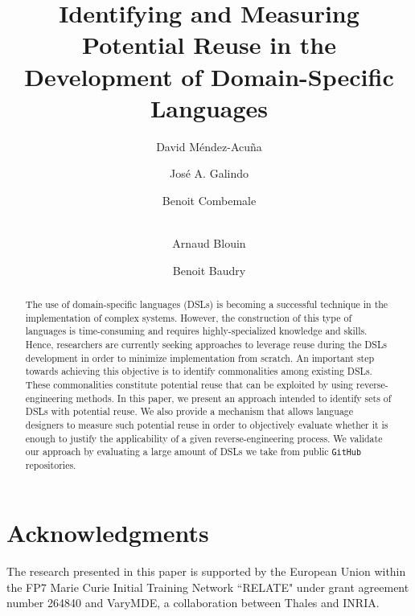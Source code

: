 \documentclass[runningheads,a4paper]{llncs}
\begin{document}
\mainmatter  %

\title{Identifying and Measuring Potential Reuse in the Development of Domain-Specific Languages}


\author{David M\'endez-Acu\~na \and Jos\'e A. Galindo \and Benoit Combemale \and \\ Arnaud Blouin \and Benoit Baudry}

\maketitle

\begin{abstract} 

The use of domain-specific languages (DSLs) is becoming a successful technique in the implementation of complex systems. However, the construction of this type of languages is time-consuming and requires highly-specialized knowledge and skills. Hence, researchers are currently seeking approaches to leverage reuse during the DSLs development in order to minimize implementation from scratch. An important step towards achieving this objective is to identify commonalities among existing DSLs. These commonalities constitute potential reuse that can be exploited by using reverse-engineering methods. In this paper, we present an approach intended to identify sets of DSLs with potential reuse. We also provide a mechanism that allows language designers to measure such potential reuse in order to objectively evaluate whether it is enough to justify the applicability of a given reverse-engineering process. We validate our approach by evaluating a large amount of DSLs we take from public \texttt{GitHub} repositories.

\end{abstract}



%

%
%
%
%
%

\section*{Acknowledgments}
The research presented in this paper is supported by the European Union within the FP7 Marie Curie Initial Training Network ``RELATE" under grant agreement number 264840 and VaryMDE, a collaboration between Thales and INRIA.



\end{document}
